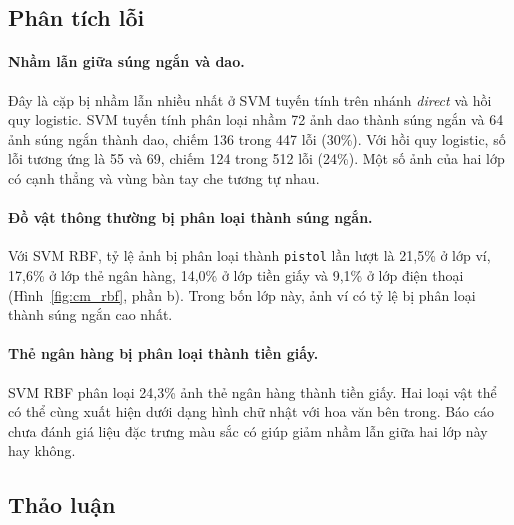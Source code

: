 \subsection{Phân tích lỗi}

\paragraph{Nhầm lẫn giữa súng ngắn và dao.} Đây là cặp bị nhầm lẫn nhiều nhất ở SVM tuyến tính trên nhánh \emph{direct} và hồi quy logistic. SVM tuyến tính phân loại nhầm 72 ảnh dao thành súng ngắn và 64 ảnh súng ngắn thành dao, chiếm 136 trong 447 lỗi (30\%). Với hồi quy logistic, số lỗi tương ứng là 55 và 69, chiếm 124 trong 512 lỗi (24\%). Một số ảnh của hai lớp có cạnh thẳng và vùng bàn tay che tương tự nhau.

\paragraph{Đồ vật thông thường bị phân loại thành súng ngắn.} Với SVM RBF, tỷ lệ ảnh bị phân loại thành \texttt{pistol} lần lượt là 21,5\% ở lớp ví, 17,6\% ở lớp thẻ ngân hàng, 14,0\% ở lớp tiền giấy và 9,1\% ở lớp điện thoại (Hình~\ref{fig:cm_rbf}, phần b). Trong bốn lớp này, ảnh ví có tỷ lệ bị phân loại thành súng ngắn cao nhất.

\paragraph{Thẻ ngân hàng bị phân loại thành tiền giấy.} SVM RBF phân loại 24,3\% ảnh thẻ ngân hàng thành tiền giấy. Hai loại vật thể có thể cùng xuất hiện dưới dạng hình chữ nhật với hoa văn bên trong. Báo cáo chưa đánh giá liệu đặc trưng màu sắc có giúp giảm nhầm lẫn giữa hai lớp này hay không.

\subsection{Thảo luận}
\label{sec:discussion}


